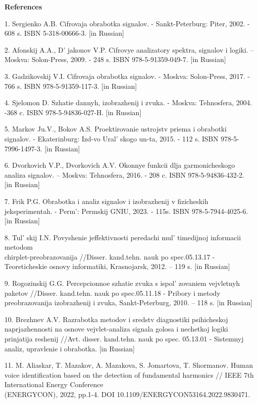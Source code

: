 \begin{center}
{\bfseries References}
\end{center}

\begin{references}
1. Sergienko A.B. Cifrovaja obrabotka signalov. - Sankt-Peterburg: Piter,
2002. - 608 s. ISBN 5-318-00666-3. {[}in Russian{]}

2. Afonskij A.A., D' jakonov V.P. Cifrovye analizatory
spektra, signalov i logiki. -- Moskva: Solon-Press, 2009. - 248 s. ISBN
978-5-91359-049-7. {[}in Russian{]}

3. Gadzikovskij V.I. Cifrovaja obrabotka signalov. - Moskva: Solon-Press,
2017. - 766 s. ISBN 978-5-91359-117-3. {[}in Russian{]}

4. Sjelomon D. Szhatie dannyh, izobrazhenij i zvuka. - Moskva:
Tehnosfera, 2004. -368 c. ISBN 978-5-94836-027-H. {[}in Russian{]}

5. Markov Ju.V., Bokov A.S. Proektirovanie ustrojstv priema i obrabotki
signalov. - Ekaterinburg: Izd-vo Ural' skogo un-ta, 2015.
- 112 s. ISBN 978-5-7996-1497-3. {[}in Russian{]}

6. Dvorkovich V.P., Dvorkovich A.V. Okonnye funkcii dlja garmonicheskogo
analiza signalov. -- Moskva: Tehnosfera, 2016. - 208 c. ISBN
978-5-94836-432-2. {[}in Russian{]}

7. Frik P.G. Obrabotka i analiz signalov i izobrazhenij v fizicheskih
jeksperimentah. - Perm': Permskij GNIU, 2023. - 115s.
ISBN 978-5-7944-4025-6. {[}in Russian{]}

8. Tul' skij I.N. Povyshenie jeffektivnosti peredachi
mul' timedijnoj informacii metodom\\
chirplet-preobrazovanija //Disser. kand.tehn. nauk po spec.05.13.17 -
Teoreticheskie osnovy informatiki, Krasnojarsk, 2012. -- 119 s. {[}in
Russian{]}

9. Rogozinskij G.G. Percepcionnoe szhatie zvuka s
ispol' zovaniem vejvletnyh paketov //Disser. kand.tehn.
nauk po spec.05.11.18 - Pribory i metody preobrazovanija izobrazhenij i
zvuka, Sankt-Peterburg, 2010. -- 118 s. {[}in Russian{]}

10. Brezhnev A.V. Razrabotka metodov i sredstv diagnostiki psihicheskoj
naprjazhennosti na osnove vejvlet-analiza signala golosa i nechetkoj
logiki prinjatija reshenij //Avt. disser. kand.tehn. nauk po spec.
05.13.01 - Sistemnyj analiz, upravlenie i obrabotka. {[}in Russian{]}

11. M. Aliaskar, T. Mazakov, A. Mazakova, S. Jomartova, T. Shormanov.
Human voice identification based on the detection of fundamental
harmonics // IEEE 7th International Energy Conference\\
(ENERGYCON)\emph{,} 2022, pp.1-4. DOI
10.1109/ENERGYCON53164.2022.9830471.


\end{references}
